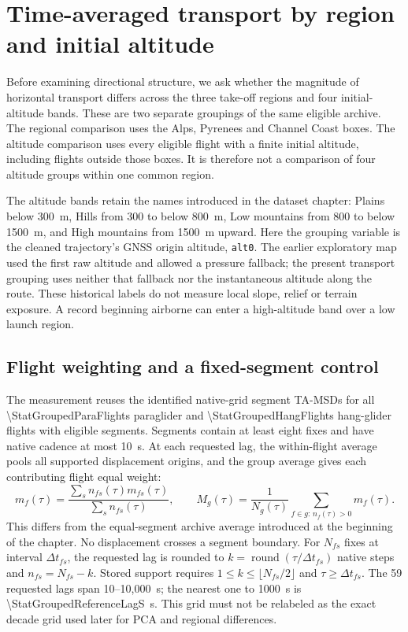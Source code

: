 \section{Time-averaged transport by region and initial altitude}
\label{sec:grouped-tamsd}

Before examining directional structure, we ask whether the magnitude of horizontal
transport differs across the three take-off regions and four initial-altitude bands.
These are two separate groupings of the same eligible archive. The regional comparison
uses the Alps, Pyrenees and Channel Coast boxes. The altitude comparison uses every
eligible flight with a finite initial altitude, including flights outside those boxes.
It is therefore not a comparison of four altitude groups within one common region.

The altitude bands retain the names introduced in the dataset chapter:
Plains below \SI{300}{\metre}, Hills from 300 to below \SI{800}{\metre},
Low mountains from 800 to below \SI{1500}{\metre}, and High mountains from
\SI{1500}{\metre} upward. Here the grouping variable is the cleaned trajectory's
GNSS origin altitude, \texttt{alt0}. The earlier exploratory map used the first raw
altitude and allowed a pressure fallback; the present transport grouping uses neither
that fallback nor the instantaneous altitude along the route. These historical labels
do not measure local slope, relief or terrain exposure. A record beginning airborne
can enter a high-altitude band over a low launch region.

\subsection{Flight weighting and a fixed-segment control}

The measurement reuses the identified native-grid segment TA-MSDs for all
\num{\StatGroupedParaFlights} paraglider and \num{\StatGroupedHangFlights}
hang-glider flights with eligible segments. Segments contain at least eight fixes
and have native cadence at most \SI{10}{\second}. At each requested lag, the
within-flight average pools all supported displacement origins, and the group
average gives each contributing flight equal weight:
\begin{equation}
 m_f(\tau)=\frac{\sum_s n_{fs}(\tau)m_{fs}(\tau)}{\sum_s n_{fs}(\tau)},\qquad
 M_g(\tau)=\frac{1}{N_g(\tau)}\sum_{f\in g:\,n_f(\tau)>0}m_f(\tau).
 \label{eq:grouped-flight-tamsd}
\end{equation}
This differs from the equal-segment archive average introduced at the beginning
of the chapter. No displacement crosses a segment boundary. For $N_{fs}$ fixes
at interval $\Delta t_{fs}$, the requested lag is rounded to
$k=\operatorname{round}(\tau/\Delta t_{fs})$ native steps and
$n_{fs}=N_{fs}-k$. Stored support requires $1\le k\le\lfloor N_{fs}/2\rfloor$
and $\tau\ge\Delta t_{fs}$. The 59 requested lags span 10--10,000~s; the nearest
one to 1000~s is \SI{\StatGroupedReferenceLagS}{\second}. This grid must not be
relabeled as the exact decade grid used later for PCA and regional differences.

